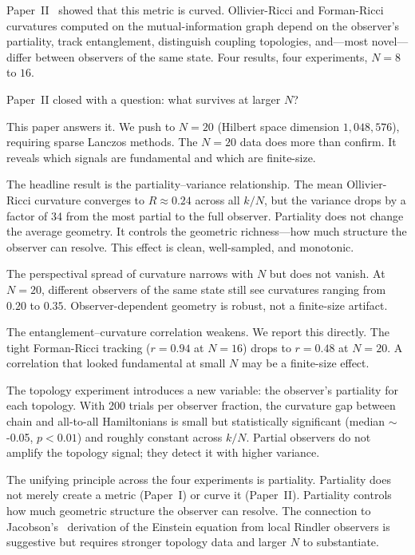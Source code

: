 \documentclass[aps,pra,twocolumn,superscriptaddress,floatfix]{revtex4-2}
\begin{document}
Paper~II~\cite{glass2026plc2} showed that this metric is curved.  Ollivier-Ricci and Forman-Ricci curvatures computed on the mutual-information graph depend on the observer's partiality, track entanglement, distinguish coupling topologies, and---most novel---differ between observers of the same state.  Four results, four experiments, $N = 8$ to $16$.

Paper~II closed with a question: what survives at larger $N$?

This paper answers it.  We push to $N = 20$ (Hilbert space dimension $1{,}048{,}576$), requiring sparse Lanczos methods.  The $N = 20$ data does more than confirm.  It reveals which signals are fundamental and which are finite-size.

The headline result is the partiality--variance relationship.  The mean Ollivier-Ricci curvature converges to $R \approx 0.24$ across all $k/N$, but the variance drops by a factor of 34 from the most partial to the full observer.  Partiality does not change the average geometry.  It controls the geometric richness---how much structure the observer can resolve.  This effect is clean, well-sampled, and monotonic.

The perspectival spread of curvature narrows with $N$ but does not vanish.  At $N = 20$, different observers of the same state still see curvatures ranging from $0.20$ to $0.35$.  Observer-dependent geometry is robust, not a finite-size artifact.

The entanglement--curvature correlation weakens.  We report this directly.  The tight Forman-Ricci tracking ($r = 0.94$ at $N = 16$) drops to $r = 0.48$ at $N = 20$.  A correlation that looked fundamental at small $N$ may be a finite-size effect.

The topology experiment introduces a new variable: the observer's partiality for each topology.  With 200 trials per observer fraction, the curvature gap between chain and all-to-all Hamiltonians is small but statistically significant (median $\sim$-0.05, $p < 0.01$) and roughly constant across $k/N$.  Partial observers do not amplify the topology signal; they detect it with higher variance.

The unifying principle across the four experiments is partiality.  Partiality does not merely create a metric (Paper~I) or curve it (Paper~II).  Partiality controls how much geometric structure the observer can resolve.  The connection to Jacobson's~\cite{jacobson1995} derivation of the Einstein equation from local Rindler observers is suggestive but requires stronger topology data and larger $N$ to substantiate.
\end{document}

